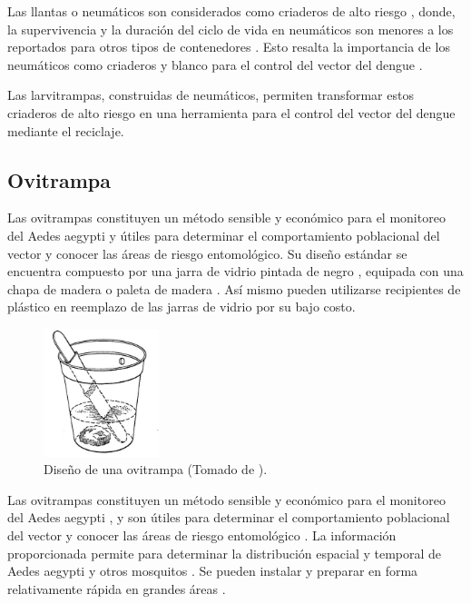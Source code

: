 Las llantas o neumáticos son considerados como criaderos de alto riesgo
\cite{bisset2008distribucion, manrique1998desarrollo, ulloa1996abundancia}, donde, la
supervivencia y la duración del ciclo de vida en neumáticos son menores a los reportados para
otros tipos de contenedores \cite{manrique1998desarrollo}. Esto resalta la importancia de los
neumáticos como criaderos y blanco para el control del vector del dengue \cite{manrique1998desarrollo, ulloa1996abundancia}.

Las larvitrampas, construidas de neumáticos, permiten transformar estos criaderos de alto
riesgo en una herramienta para el control del vector del dengue mediante el reciclaje.

\subsection{Ovitrampa}
\label{sec:densidad-vectorial-ovitrampa}
Las ovitrampas constituyen un método sensible y económico para el monitoreo del Aedes aegypti y
útiles para determinar el comportamiento poblacional del vector y conocer las áreas de riesgo
entomológico\cite{cenaprece2013}. Su diseño estándar se encuentra compuesto por una jarra de
vidrio pintada de negro \cite{dengueUruguayCap1, world2009dengue}, equipada con una chapa de
madera o paleta de madera \cite{dengueUruguayCap1, world2009dengue, website:TimothyOvitrap2014,
manualControlArg2009}. Así mismo pueden utilizarse recipientes de plástico
\cite{website:TimothyOvitrap2014, cenaprece2013, manualControlArg2009, MARQUES1993} en reemplazo
de las jarras de vidrio por su bajo costo.


\begin{figure}
\centering
\includegraphics[width=0.3\textwidth]{capitulo-3/graphics/ovitrampa.jpg}
\caption{\label{fig:cap3-larvitrampas} Diseño de una ovitrampa (Tomado de
\cite{website:TimothyOvitrap2014}).}
\end{figure}

Las ovitrampas constituyen un método sensible y económico para el monitoreo del Aedes aegypti
\cite{cenaprece2013, world2009dengue}, y son útiles para determinar el comportamiento poblacional
del vector y conocer las áreas de riesgo entomológico \cite{cenaprece2013}. La información
proporcionada permite para determinar la distribución espacial y temporal de Aedes aegypti y otros
mosquitos \cite{dengueUruguayCap1, NINO2011}. Se pueden instalar y preparar en forma relativamente
rápida en grandes áreas \cite{world2009dengue}.


